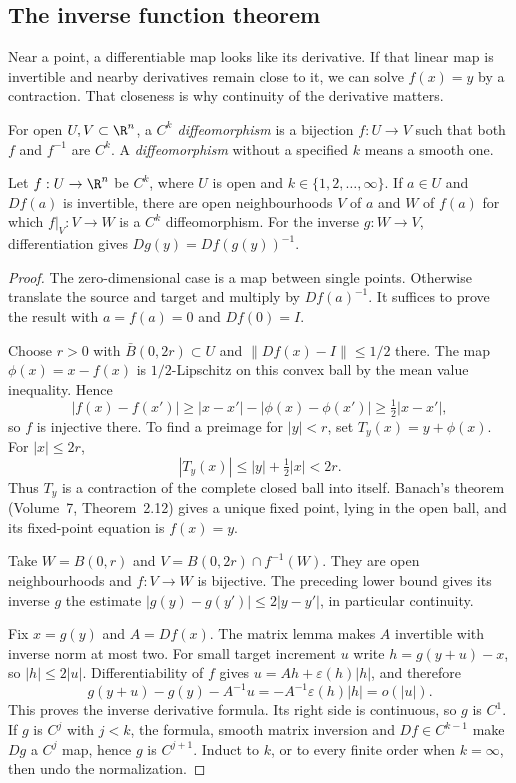 \subsection*{The inverse function theorem}

Near a point, a differentiable map looks like its derivative. If that linear map is invertible and nearby derivatives remain close to it, we can solve $f(x)=y$ by a contraction. That closeness is why continuity of the derivative matters.

\begin{definition}
For open $U,V\subset\R^n$, a \emph{$C^k$ diffeomorphism} is a bijection $f:U\to V$ such that both $f$ and $f^{-1}$ are $C^k$. A \emph{diffeomorphism} without a specified $k$ means a smooth one.
\end{definition}

\begin{theorem}\label{thm:inverse}
Let $f:U\to\R^n$ be $C^k$, where $U$ is open and $k\in\{1,2,\ldots,\infty\}$. If $a\in U$ and $Df(a)$ is invertible, there are open neighbourhoods $V$ of $a$ and $W$ of $f(a)$ for which $f|_V:V\to W$ is a $C^k$ diffeomorphism. For the inverse $g:W\to V$, differentiation gives $Dg(y)=Df(g(y))^{-1}$.
\end{theorem}
\begin{proof}
The zero-dimensional case is a map between single points. Otherwise translate the source and target and multiply by $Df(a)^{-1}$. It suffices to prove the result with $a=f(a)=0$ and $Df(0)=I$.

Choose $r>0$ with $\bar B(0,2r)\subset U$ and $\|Df(x)-I\|\le1/2$ there. The map $\phi(x)=x-f(x)$ is $1/2$-Lipschitz on this convex ball by the mean value inequality. Hence
\[
|f(x)-f(x')|\ge|x-x'|-|\phi(x)-\phi(x')|\ge\tfrac12|x-x'|,
\]
so $f$ is injective there. To find a preimage for $|y|<r$, set $T_y(x)=y+\phi(x)$. For $|x|\le2r$,
\[
|T_y(x)|\le|y|+\tfrac12|x|<2r.
\]
Thus $T_y$ is a contraction of the complete closed ball into itself. Banach's theorem (Volume~7, Theorem~2.12) gives a unique fixed point, lying in the open ball, and its fixed-point equation is $f(x)=y$.

Take $W=B(0,r)$ and $V=B(0,2r)\cap f^{-1}(W)$. They are open neighbourhoods and $f:V\to W$ is bijective. The preceding lower bound gives its inverse $g$ the estimate $|g(y)-g(y')|\le2|y-y'|$, in particular continuity.

Fix $x=g(y)$ and $A=Df(x)$. The matrix lemma makes $A$ invertible with inverse norm at most two. For small target increment $u$ write $h=g(y+u)-x$, so $|h|\le2|u|$. Differentiability of $f$ gives $u=Ah+\varepsilon(h)|h|$, and therefore
\[
g(y+u)-g(y)-A^{-1}u=-A^{-1}\varepsilon(h)|h|=o(|u|).
\]
This proves the inverse derivative formula. Its right side is continuous, so $g$ is $C^1$. If $g$ is $C^j$ with $j<k$, the formula, smooth matrix inversion and $Df\in C^{k-1}$ make $Dg$ a $C^j$ map, hence $g$ is $C^{j+1}$. Induct to $k$, or to every finite order when $k=\infty$, then undo the normalization.
\end{proof}


